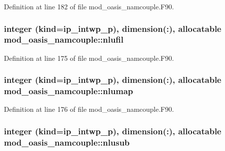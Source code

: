 Definition at line 182 of file mod\+\_\+oasis\+\_\+namcouple.\+F90.

\hypertarget{classmod__oasis__namcouple_a31f62f64cbcf344e529d0576386d0751}{
\subsubsection[{nlufil}]{\setlength{\rightskip}{0pt plus 5cm}integer (kind=ip\+\_\+intwp\+\_\+p), dimension(\+:), allocatable mod\+\_\+oasis\+\_\+namcouple\+::nlufil\hspace{0.3cm}{\ttfamily [private]}}}\label{classmod__oasis__namcouple_a31f62f64cbcf344e529d0576386d0751}


Definition at line 175 of file mod\+\_\+oasis\+\_\+namcouple.\+F90.

\hypertarget{classmod__oasis__namcouple_a42367b4984c6ac4c69cbdcd315cb54e6}{
\subsubsection[{nlumap}]{\setlength{\rightskip}{0pt plus 5cm}integer (kind=ip\+\_\+intwp\+\_\+p), dimension(\+:), allocatable mod\+\_\+oasis\+\_\+namcouple\+::nlumap\hspace{0.3cm}{\ttfamily [private]}}}\label{classmod__oasis__namcouple_a42367b4984c6ac4c69cbdcd315cb54e6}


Definition at line 176 of file mod\+\_\+oasis\+\_\+namcouple.\+F90.

\hypertarget{classmod__oasis__namcouple_aefed5eaa9924d249e979a5a772a46979}{
\subsubsection[{nlusub}]{\setlength{\rightskip}{0pt plus 5cm}integer (kind=ip\+\_\+intwp\+\_\+p), dimension(\+:), allocatable mod\+\_\+oasis\+\_\+namcouple\+::nlusub\hspace{0.3cm}{\ttfamily [private]}}}\label{classmod__oasis__namcouple_aefed5eaa9924d249e979a5a772a46979}


